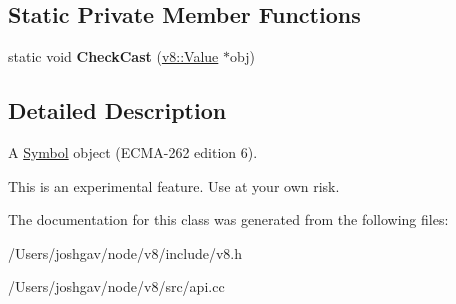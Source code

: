 \subsection*{Static Private Member Functions}
\begin{DoxyCompactItemize}
\item 
static void {\bfseries Check\+Cast} (\hyperlink{classv8_1_1_value}{v8\+::\+Value} $\ast$obj)\hypertarget{classv8_1_1_symbol_object_acf284d03fc099e6c59adc561ed6fbaa3}{}\label{classv8_1_1_symbol_object_acf284d03fc099e6c59adc561ed6fbaa3}

\end{DoxyCompactItemize}


\subsection{Detailed Description}
A \hyperlink{classv8_1_1_symbol}{Symbol} object (E\+C\+M\+A-\/262 edition 6).

This is an experimental feature. Use at your own risk. 

The documentation for this class was generated from the following files\+:\begin{DoxyCompactItemize}
\item 
/\+Users/joshgav/node/v8/include/v8.\+h\item 
/\+Users/joshgav/node/v8/src/api.\+cc\end{DoxyCompactItemize}
